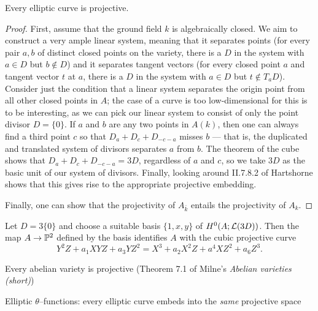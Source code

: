 \begin{theorem}
Every elliptic curve is projective.
\end{theorem}
\begin{proof}
First, assume that the ground field $k$ is algebraically closed.  We aim to construct a very ample linear system, meaning that it separates points (for every pair $a, b$ of distinct closed points on the variety, there is a $D$ in the system with $a \in D$ but $b \not\in D$) and it separates tangent vectors (for every closed point $a$ and tangent vector $t$ at $a$, there is a $D$ in the system with $a \in D$ but $t \not\in T_a D$).  Consider just the condition that a linear system separates the origin point from all other closed points in $A$; the case of a curve is too low-dimensional for this is to be interesting, as we can pick our linear system to consist of only the point divisor $D = \{0\}$.  If $a$ and $b$ are any two points in $A(k)$, then one can always find a third point $c$ so that $D_a + D_c + D_{-c-a}$ misses $b$ --- that is, the duplicated and translated system of divisors separates $a$ from $b$.  The theorem of the cube shows that $D_a + D_c + D_{-c-a} = 3D$, regardless of $a$ and $c$, so we take $3D$ as the basic unit of our system of divisors.  Finally, looking around II.7.8.2 of Hartshorne shows that this gives rise to the appropriate projective embedding.

Finally, one can show that the projectivity of $A_{\bar k}$ entails the projectivity of $A_k$.
\end{proof}

\begin{remark}
Let $D = 3\{0\}$ and choose a suitable basis $\{1, x, y\}$ of $H^0(A; \L(3D))$. Then the map $A \to \P^2$ defined by the basis identifies $A$ with the cubic projective curve \[Y^2 Z + a_1 XYZ + a_3 YZ^2 = X^3 + a_2 X^2 Z + a^4 X Z^2 + a_6 Z^3.\] 
\end{remark}

Every abelian variety is projective (Theorem 7.1 of Milne's \textit{Abelian varieties (short)})

Elliptic $\theta$--functions: every elliptic curve embeds into the \emph{same} projective space

